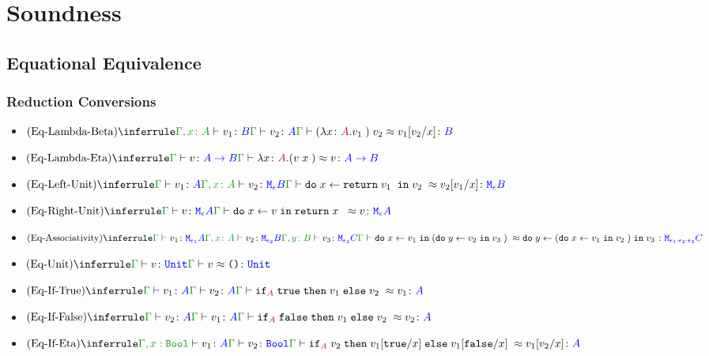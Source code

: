 \documentclass{report}
\begin{document}
\chapter{Soundness}
\section{Equational Equivalence}
\subsection{Reduction Conversions}
\begin{itemize}
    \item $\ntreeruleII{\eqbeta}{\typerelation{\gax}{v_1}{B}}{\gtyperelation{v_2}{A}}{\gberelation{\apply{(\lam{x}{A}{v_1})}{v_2} }{ v_1\ssub{x}{v_2}}{B}}$
    
    \item $\ntreeruleI{\eqeta}{\gtyperelation{v}{\ab}}{\gberelation{\lam{x}{A}{(\apply{v}{x}})}{v}{\ab}}$
 

    \item $\ntreeruleII{\eqleftunit}{\gtyperelation{v_1}{A}}{\typerelation{\gax}{v_2}{\meb}}{\gberelation{\doin{x}{\return{v_1}}{v_2}}{v_2\ssub{x}{v_1}}{\meb}}$
    
    \item $\ntreeruleI{\eqrightunit}{\gtyperelation{v}{\mea}}{\gberelation{\doin{x}{v}{\return{x}} }{v}{\mea}}$
    \item $\ntreeruleIII{\eqassociativity}{
            \gtyperelation{v_1}{\M{\e_1}{A}} 
        }{
            \typerelation{\gax}{v_2}{\M{\e_2}{B}}
        }{
            \typerelation{\gby}{v_3}{\M{\e_3}{C}}
        }{
        \gberelation{\doin{x}{v_1}{(\doin{y}{v_2}{v_3})}}{\doin{y}{(\doin{x}{v_1}{v_2})}{v_3}}{\M{\e_1 \dot \e_2 \dot \e_3}{C}}
    }$

    \item $\ntreeruleI{\equnitequiv}{\gtyperelation{v}{\U}}{\gberelation{v}{\u}{\U}}$

    \item $\ntreeruleII{\eqiftrue}{\gtyperelation{v_1}{ A}}{\gtyperelation{v_2}{ A}}{\gberelation{\pifthenelse{A}{\t}{v_1}{v_2}}{v_1}{ A}}$
    
    \item $\ntreeruleII{\eqiffalse}{\gtyperelation{v_2}{ A}}{\gtyperelation{v_1}{ A}}{\gberelation{\pifthenelse{A}{\f}{v_1}{v_2}}{v_2}{ A}}$
    
    \item $\ntreeruleII{\eqifeta}{\typerelation{\G, x: \B}{v_1}{ A}}{\gtyperelation{v_2}{\B}}{\gberelation{\pifthenelse{A}{v_2}{v_1\ssub{x}{\t}}{v_1\ssub{x}{\f}}}{v_1\ssub{x}{v_2}}{ A}}$
    
\end{itemize}
\end{document}

